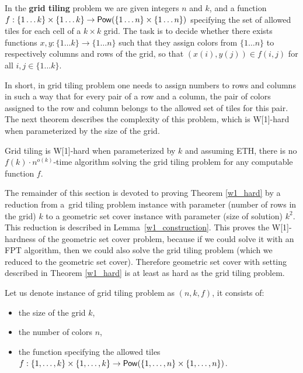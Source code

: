 \begin{defi}
In the \textbf{grid tiling} problem we are given integers $n$ and $k$,
and a function
$f : \{1 \ldots k\} \times \{1 \ldots k\} \rightarrow \mathsf{Pow}(\{1 \ldots n\} \times \{1 \ldots n\})$
specifying the set of allowed tiles for each cell of a $k \times k$ grid.
The task is to decide whether there exists functions
$x,y : \{1 \ldots k\} \rightarrow \{1 \ldots n\}$
such that they assign colors from $\{1 \ldots n\}$
to respectively columns and rows of the grid,
so that $(x(i), y(j)) \in f(i, j)$ for all $i,j \in \{1 \ldots k\}$.
\end{defi}

In short, in grid tiling problem one needs to assign numbers
to rows and columns in such a way
that for every pair of a row and a column,
the pair of colors assigned
to the row and column 
belongs to the allowed set of tiles for this pair.
The next theorem describes the complexity of this problem,
which is W[1]-hard when parameterized by the size of the grid.



\begin{tw}
\label{grid_tiling_w1_hard}
\textbf{\cite{marx_grid_tiling}}
Grid tiling is W[1]-hard when parameterized by $k$ and
assuming ETH, there is no $f(k)\cdot n^{o(k)}$-time
algorithm solving the grid tiling problem
for any computable function $f$.
\end{tw}

The remainder of this section is devoted to proving Theorem \ref{w1_hard}
by a reduction from a~grid tiling problem instance
with parameter (number of rows in the grid) $k$
to a geometric set cover instance with parameter (size of solution) $k^2$.
This reduction is described in Lemma~\ref{w1_construction}.
This proves the W[1]-hardness of the geometric set cover problem,
because if we could solve it with an FPT algorithm,
then we could also solve the grid tiling problem
(which we reduced to the geometric set cover).
Therefore geometric set cover with setting
described in Theorem \ref{w1_hard}
is at least as hard as the grid tiling problem.

\newcommand{\hvWeight}{W_{\mathsf{hv}}}
\newcommand{\solWeight}{\hvWeight+k^2\delta }
\newcommand{\instanceSetCover}{(\points, \sets, w, 3k^2+2k)}
\newcommand{\instanceGridTiling}{(n,k,f)}
\newcommand{\yes}{\texttt{YES}}
\newcommand{\no}{\texttt{NO}}

Let us denote instance of grid tiling problem as $\instanceGridTiling$, it consists of:
\begin{itemize}
\item the size of the grid $k$,
\item the number of colors $n$,
\item the function specifying the allowed tiles
$f : \{1, \ldots, k\} \times \{1, \ldots, k\} \rightarrow \mathsf{Pow}(\{1, \ldots, n\} \times \{1, \ldots, n\})$.
\end{itemize}

